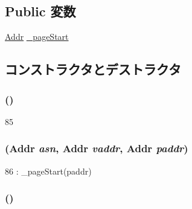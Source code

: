 \subsection*{Public 変数}
\begin{DoxyCompactItemize}
\item 
\hyperlink{classm5_1_1params_1_1Addr}{Addr} \hyperlink{structMipsISA_1_1TlbEntry_ad8da2710e276585b6631902816b5284f}{\_\-pageStart}
\end{DoxyCompactItemize}


\subsection{コンストラクタとデストラクタ}
\hypertarget{structMipsISA_1_1TlbEntry_ad069716fb78ffaa2d9bfba679a8eac9a}{
\subsubsection[{TlbEntry}]{ ()}}
\label{structMipsISA_1_1TlbEntry_ad069716fb78ffaa2d9bfba679a8eac9a}



\begin{DoxyCode}
85 {}
\end{DoxyCode}
\hypertarget{structMipsISA_1_1TlbEntry_a69a4824fbe38adbd1517dda05272617d}{
\subsubsection[{TlbEntry}]{ ({\bf Addr} {\em asn}, \/  {\bf Addr} {\em vaddr}, \/  {\bf Addr} {\em paddr})}}
\label{structMipsISA_1_1TlbEntry_a69a4824fbe38adbd1517dda05272617d}



\begin{DoxyCode}
86 : _pageStart(paddr) {}
\end{DoxyCode}
\hypertarget{structMipsISA_1_1TlbEntry_ad069716fb78ffaa2d9bfba679a8eac9a}{
\subsubsection[{TlbEntry}]{ ()}}
\label{structMipsISA_1_1TlbEntry_ad069716fb78ffaa2d9bfba679a8eac9a}



